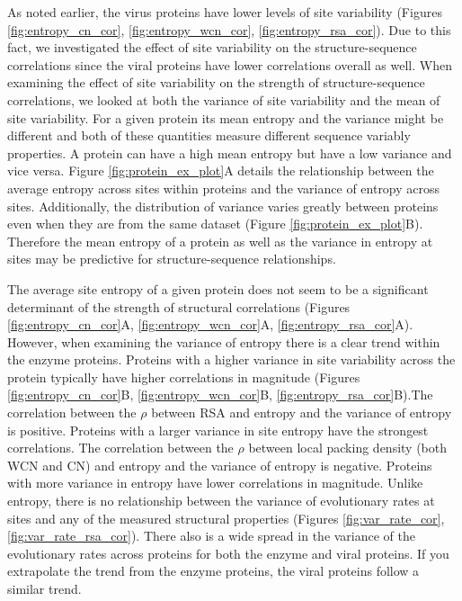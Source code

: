 \documentclass[12pt]{article}
\begin{document}
\indent As noted earlier, the virus proteins have lower levels of site variability (Figures \ref{fig:entropy_cn_cor}, \ref{fig:entropy_wcn_cor}, \ref{fig:entropy_rsa_cor}). Due to this fact, we investigated the effect of site variability on the structure-sequence correlations since the viral proteins have lower correlations overall as well. When examining the effect of site variability on the strength of structure-sequence correlations, we looked at both the variance of site variability and the mean of site variability. For a given protein its mean entropy and the variance might be different and both of these quantities measure different sequence variably properties. A protein can have a high mean entropy but have a low variance and vice versa. Figure \ref{fig:protein_ex_plot}A details the relationship between the average entropy across sites within proteins and the variance of entropy across sites. Additionally, the distribution of variance varies greatly between proteins even when they are from the same dataset (Figure \ref{fig:protein_ex_plot}B). Therefore the mean entropy of a protein as well as the variance in entropy at sites may be predictive for structure-sequence relationships.
 
\indent The average site entropy of a given protein does not seem to be a significant determinant of the strength of structural correlations (Figures \ref{fig:entropy_cn_cor}A, \ref{fig:entropy_wcn_cor}A, \ref{fig:entropy_rsa_cor}A). However, when examining the variance of entropy there is a clear trend within the enzyme proteins.  Proteins with a higher variance in site variability across the protein typically have higher  correlations in magnitude (Figures \ref{fig:entropy_cn_cor}B, \ref{fig:entropy_wcn_cor}B, \ref{fig:entropy_rsa_cor}B).The correlation between the $\rho$ between RSA and entropy and the variance of entropy is positive. Proteins with a larger variance in site entropy have the strongest correlations. The correlation between the $\rho$ between local packing density (both WCN and CN) and entropy and the variance of entropy is negative. Proteins with more variance in entropy have lower correlations in magnitude. Unlike entropy, there is no relationship between the variance of evolutionary rates at sites and any of the measured structural properties (Figures \ref{fig:var_rate_cor}, \ref{fig:var_rate_rsa_cor}). There also is a wide spread in the variance of the evolutionary rates across proteins for both the enzyme and viral proteins.  If you extrapolate the trend from the enzyme proteins, the viral proteins follow a similar trend. 
\end{document}
